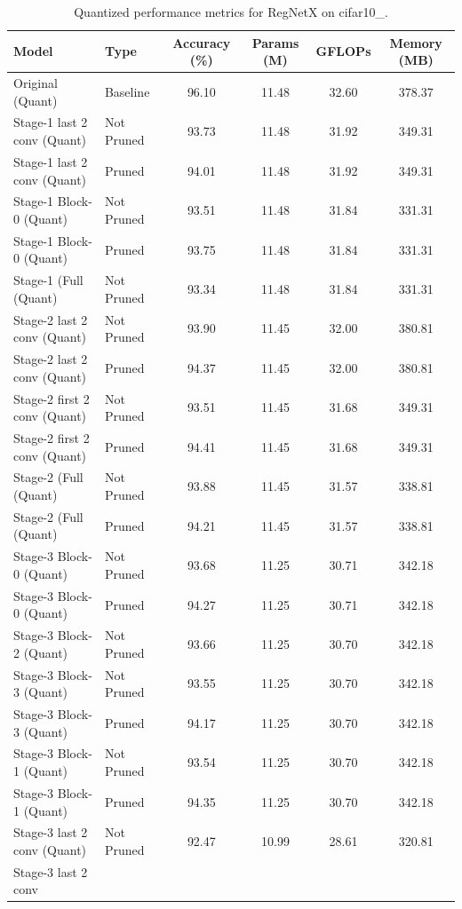 \begin{table}
\caption{Quantized performance metrics for RegNetX on cifar10_.}
\label{tab:RegNetX_cifar10__quant}
\begin{tabular}{llcccc}
\toprule
Model & Type & Accuracy (\%) & Params (M) & GFLOPs & Memory (MB) \\
\midrule
Original
(Quant) & Baseline & 96.10 & 11.48 & 32.60 & 378.37 \\
Stage-1 last 2 conv
(Quant) & Not Pruned & 93.73 & 11.48 & 31.92 & 349.31 \\
Stage-1 last 2 conv
(Quant) & Pruned & 94.01 & 11.48 & 31.92 & 349.31 \\
Stage-1 Block-0
(Quant) & Not Pruned & 93.51 & 11.48 & 31.84 & 331.31 \\
Stage-1 Block-0
(Quant) & Pruned & 93.75 & 11.48 & 31.84 & 331.31 \\
Stage-1 (Full
(Quant) & Not Pruned & 93.34 & 11.48 & 31.84 & 331.31 \\
Stage-2 last 2 conv
(Quant) & Not Pruned & 93.90 & 11.45 & 32.00 & 380.81 \\
Stage-2 last 2 conv
(Quant) & Pruned & 94.37 & 11.45 & 32.00 & 380.81 \\
Stage-2 first 2 conv
(Quant) & Not Pruned & 93.51 & 11.45 & 31.68 & 349.31 \\
Stage-2 first 2 conv
(Quant) & Pruned & 94.41 & 11.45 & 31.68 & 349.31 \\
Stage-2 (Full
(Quant) & Not Pruned & 93.88 & 11.45 & 31.57 & 338.81 \\
Stage-2 (Full
(Quant) & Pruned & 94.21 & 11.45 & 31.57 & 338.81 \\
Stage-3 Block-0
(Quant) & Not Pruned & 93.68 & 11.25 & 30.71 & 342.18 \\
Stage-3 Block-0
(Quant) & Pruned & 94.27 & 11.25 & 30.71 & 342.18 \\
Stage-3 Block-2
(Quant) & Not Pruned & 93.66 & 11.25 & 30.70 & 342.18 \\
Stage-3 Block-3
(Quant) & Not Pruned & 93.55 & 11.25 & 30.70 & 342.18 \\
Stage-3 Block-3
(Quant) & Pruned & 94.17 & 11.25 & 30.70 & 342.18 \\
Stage-3 Block-1
(Quant) & Not Pruned & 93.54 & 11.25 & 30.70 & 342.18 \\
Stage-3 Block-1
(Quant) & Pruned & 94.35 & 11.25 & 30.70 & 342.18 \\
Stage-3 last 2 conv
(Quant) & Not Pruned & 92.47 & 10.99 & 28.61 & 320.81 \\
Stage-3 last 2 conv

\end{tabular}
\end{table}
